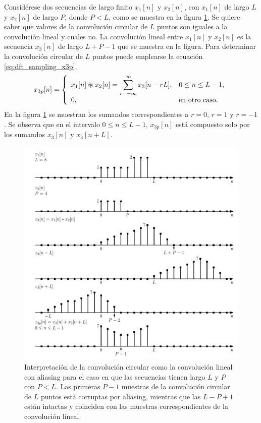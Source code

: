 \documentclass[a4paper]{report}
\begin{document}
Considérese dos secuencias de largo finito \(x_1[n]\) y \(x_2[n]\), con \(x_1[n]\) de largo \(L\) y \(x_2[n]\) de largo \(P\), donde \(P<L\), como se muestra en la figura \ref{fig:dft_circular_convolution_as_linear_with_aliasing_example_2}. Se quiere saber que valores de la convolución circular de \(L\) puntos son iguales a la convolución lineal y cuales no. La convolución lineal entre \(x_1[n]\) y \(x_2[n]\) es la secuencia \(x_3[n]\) de largo \(L+P-1\) que se muestra en la figura. Para determinar la convolución circular de \(L\) puntos puede emplearse la ecuación \ref{eq:dft_sampling_x3p},
\[
 x_{3p}[n]=
 \left\{ 
 \begin{array}{ll}
  x_1[n]\circledast x_2[n]=\displaystyle\sum_{r=-\infty}^\infty x_3[n-rL], & 0\leq n\leq L-1,\\[\medskipamount]
  0, & \textrm{en otro caso.}
 \end{array}
 \right. 
\]
En la figura \ref{fig:dft_circular_convolution_as_linear_with_aliasing_example_2} se muestran los sumandos correspondientes a \(r=0\), \(r=1\) y \(r=-1\). Se observa que en el intervalo \(0\leq n\leq L-1\), \(x_{3p}[n]\) está compuesto solo por los sumandos \(x_3[n]\) y \(x_3[n+L]\).
\begin{figure}[!htb]
 \begin{center}
 \includegraphics[width=1\textwidth]{figuras/dft_circular_convolution_as_linear_with_aliasing_example_2.pdf}
 \caption{\label{fig:dft_circular_convolution_as_linear_with_aliasing_example_2} Interpretación de la convolución circular como la convolución lineal con aliasing para el caso en que las secuencias tienen largo \(L\) y \(P\) con \(P<L\). Las primeras \(P-1\) muestras de la convolución circular de \(L\) puntos está corruptas por aliasing, mientras que las \(L-P+1\) están intactas  y coinciden con las muestras correspondientes de la convolución lineal.}
 \end{center}
\end{figure}
\end{document}
